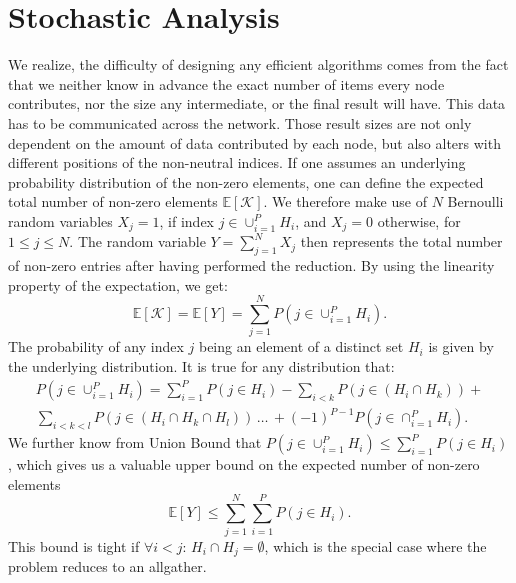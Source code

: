 \documentclass[11pt]{article}
\begin{document}
\section{Stochastic Analysis}

We realize, the difficulty of designing any efficient algorithms comes from the fact that we neither know in advance the exact number of items every node contributes, nor the size any intermediate, or the final result will have. This data has to be communicated across the network. Those result sizes are not only dependent on the amount of data contributed by each node, but also alters with different positions of the non-neutral indices. 
If one assumes an underlying probability distribution of the non-zero elements, one can define the expected total number of non-zero elements $\mathbb{E}[\mathcal{K}]$. We therefore make use of $N$ Bernoulli random variables $X_{j} = 1$, if index $j \in \cup_{i=1}^P H_i$, and $X_{j} = 0$ otherwise, for $1 \leq j \leq N$. The random variable $Y = \sum_{j = 1}^{N} X_j$ then represents the total number of non-zero entries after having performed the reduction. By using the linearity property of the expectation, we get: $$\mathbb{E}[\mathcal{K}] = \mathbb{E}[Y] = \sum_{j=1}^{N} P\left(j \in \cup_{i=1}^P H_i \right).$$ The probability of any index $j$ being an element of a distinct set $H_i$ is given by the underlying distribution. It is true for any distribution that: 
\begin{multline*}
P\left(j \in \cup_{i=1}^P H_i \right) = \sum_{i=1}^{P}P\left(j \in H_i\right) - \sum_{i < k}P\left(j \in \left(H_i \cap H_k\right)\right) + \\\sum_{i < k < l}P\left(j \in \left(H_i \cap H_k \cap H_l\right)\right)\,\dots\,+ (-1)^{P-1}P\left(j \in \cap_{i=1}^{P}H_i\right).
\end{multline*}We further know from Union Bound that $P\left(j \in \cup_{i=1}^P H_i \right) \leq \sum_{i=1}^{P}P\left(j \in H_i\right)$, which gives us a valuable upper bound on the expected number of non-zero elements $$\mathbb{E}[Y] \leq \sum_{j=1}^{N}\sum_{i=1}^{P}P\left(j \in H_i\right).$$ This bound is tight if $\forall i < j:\,H_i \cap H_j = \emptyset$, which is the special case where the problem reduces to an allgather.
\end{document}
